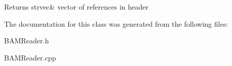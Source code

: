 \begin{DoxyReturn}{Returns}
strvec\& vector of references in header 
\end{DoxyReturn}


The documentation for this class was generated from the following files:\begin{DoxyCompactItemize}
\item 
BAMReader.h\item 
BAMReader.cpp\end{DoxyCompactItemize}
